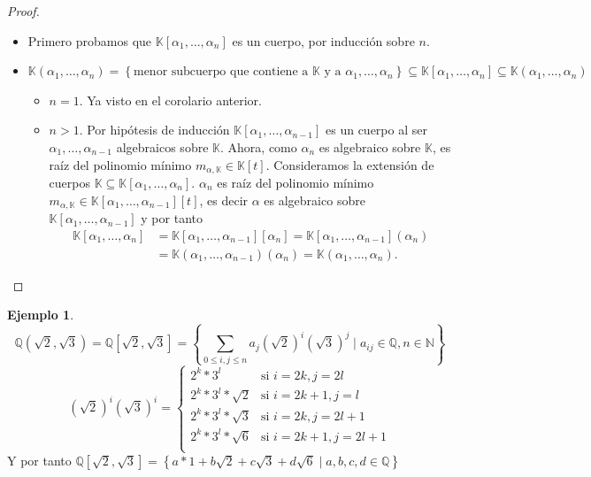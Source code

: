 \documentclass[10pt, spanish]{report}
\theoremstyle{definition}
\newtheorem*{ej}{Ejemplo}
\newcommand{\N}{\mathbb{N}}
\newcommand{\Q}{\mathbb{Q}}
\newcommand{\K}{\mathbb{K}}
\renewcommand{\leq}{\leqslant}
\begin{document}
\begin{proof}\hspace{0pt}
    \begin{itemize}
        \item Primero probamos que $\K[\alpha_1,\ldots,\alpha_n]$ es un cuerpo, por
    inducción sobre $n$.
    \item $\K(\alpha_1,\ldots,\alpha_n)=\left\{\text{menor subcuerpo que contiene a } \K \text{ y a } \alpha_1,\ldots,\alpha_n\right\}\subseteq\K[\alpha_1,\ldots,\alpha_n]\subseteq
    \K(\alpha_1,\ldots,\alpha_n)$
    \begin{itemize}
        \item $n=1$. Ya visto en el corolario anterior.
        \item $n>1$. Por hipótesis de inducción
            $\K[\alpha_1,\ldots,\alpha_{n-1}]$ es un cuerpo al ser
            $\alpha_1,\ldots,\alpha_{n-1}$ algebraicos sobre $\K$. Ahora, como
            $\alpha_n$ es algebraico sobre $\K$, es raíz del polinomio mínimo
            $m_{\alpha,\K}\in \K[t]$. Consideramos la extensión de cuerpos
            $\K\subseteq\K[\alpha_1,\ldots,\alpha_n]$. $\alpha_n$ es raíz del
            polinomio mínimo $m_{\alpha,\K}\in
            \K[\alpha_1,\ldots,\alpha_{n-1}][t]$, es decir $\alpha$ es
            algebraico sobre $\K[\alpha_1,\ldots,\alpha_{n-1}]$ y por tanto
            \begin{align*}
                \K[\alpha_1,\ldots,\alpha_{n}]
                &=\K[\alpha_1,\ldots,\alpha_{n-1}][\alpha_n]
                =\K[\alpha_1,\ldots,\alpha_{n-1}](\alpha_n)\\
                &=\K(\alpha_1,\ldots,\alpha_{n-1})(\alpha_n)
                =\K(\alpha_1,\ldots,\alpha_n).
            \end{align*}
    \end{itemize}\vspace{-1em}
    \end{itemize}
\end{proof}

\begin{ej}
    \[\Q(\sqrt{2},\sqrt{3})=\Q[\sqrt{2},\sqrt{3}]=\left\{ \sum_{0\leq
    i,j\leq n} a_j(\sqrt{2})^i(\sqrt{3})^j\mid a_{ij}\in\Q,n\in\N\right\}\]
    \[(\sqrt{2})^i(\sqrt{3})^i=\begin{cases}
        2^k*3^l &\text{si } i=2k, j=2l\\
        2^k*3^l*\sqrt{2}&\text{si } i=2k+1,j=l\\
        2^k*3^l*\sqrt{3}&\text{si } i=2k,j=2l+1\\
        2^k*3^l*\sqrt{6}&\text{si } i=2k+1,j=2l+1\\
    \end{cases}\]
    Y por tanto $\Q[\sqrt{2},\sqrt{3}]=\left\{
    a*1+b\sqrt{2}+c\sqrt{3}+d\sqrt{6}\mid a,b,c,d\in \Q    \right\} $
\end{ej}
\end{document}
